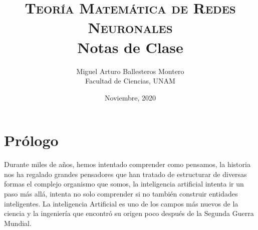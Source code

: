 \documentclass[12pt,a4paper]{book}
\title{%
\textsc{Teoría Matemática de Redes Neuronales}\\[0.5em]
\large Notas de Clase%
}
\author{%
Miguel Arturo Ballesteros Montero\\[0.5em]
Facultad de Ciencias, UNAM%
}
\date{Noviembre, 2020}
\begin{document}
\maketitle

\tableofcontents

\chapter*{Prólogo}

Durante miles de años, hemos intentado comprender como pensamos, la historia nos ha regalado grandes pensadores que han tratado de estructurar de diversas formas el complejo organismo que somos, la inteligencia artificial intenta ir un paso más allá, intenta no solo comprender si no también construir entidades inteligentes. La inteligencia Artificial es uno de los campos más nuevos de la ciencia y la ingeniería que encontró su origen poco después de la Segunda Guerra Mundial.
\end{document}
